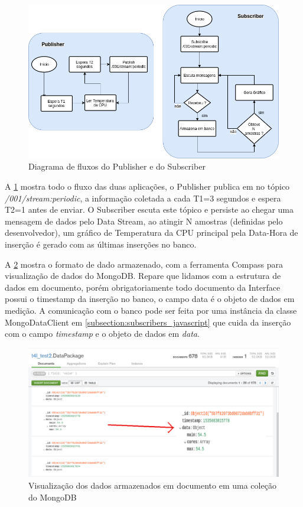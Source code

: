 \begin{figure}[h!]
\centering
\includegraphics[width=13cm]{./02_Capitulos/02_Cap4/figures/fluxo_controle_temp}
\caption{Diagrama de fluxos do Publisher e do Subscriber}
\label{fig:4.1.0/fluxo_controle_temp}
\end{figure}

A \ref{fig:4.1.0/fluxo_controle_temp} mostra todo o fluxo das duas aplicações, o Publisher publica em no tópico \textit{/001/stream:periodic}, a informação coletada a cada T1=3 segundos e espera T2=1 antes de enviar. O Subscriber escuta este tópico e persiste ao chegar uma mensagem de dados pelo Data Stream, ao atingir N amostras (definidas pelo  desenvolvedor), um gráfico de Temperatura da CPU principal pela Data-Hora de inserção é gerado com as últimas inserções no banco.


A \ref{fig:4.1.0/compass} mostra o formato de dado armazenado, com a ferramenta Compass para visualização de dados do MongoDB. Repare que lidamos com a estrutura de dados em documento, porém obrigatoriamente todo documento da Interface possui o timestamp da inserção no banco, o campo data é o objeto de dados em medição. A comunicação com o banco pode ser feita por uma instância da classe MongoDataClient em \ref{subsection:subscribers_javascript} que cuida da inserção com o campo \textit{timestamp} e o objeto de dados em \textit{data}.

\begin{figure}[h!]
\centering
\includegraphics[width=15cm]{./02_Capitulos/02_Cap4/figures/compass}
\caption{Visualização dos dados armazenados em documento em uma coleção do MongoDB}
\label{fig:4.1.0/compass}
\end{figure}

